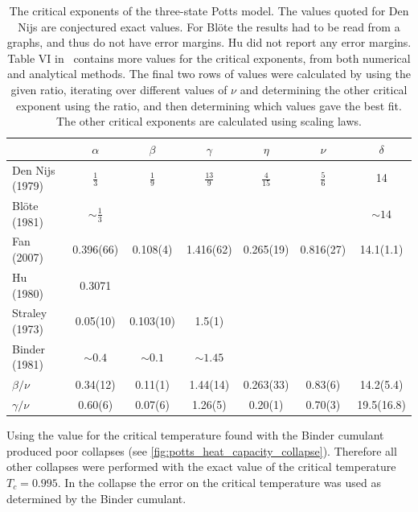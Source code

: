 \documentclass[11pt, a4paper]{report} %
\begin{document}
\begin{table}[htb]
	\begin{adjustbox}{center}
		\centering
		\renewcommand{\arraystretch}{1.5}
		\begin{tabular}{l | c c c c c c}
			\hline
			& \(\alpha\) & \(\beta\) & \(\gamma\) & \(\eta\) & \(\nu\) & \(\delta\) \\\hline
			Den Nijs (1979)~\cite{nijs:1979,baxter:1989} & \(\frac{1}{3}\) & \(\frac{1}{9}\) & \(\frac{13}{9}\) & \(\frac{4}{15}\) & \(\frac{5}{6}\) & 14 \\
			Blöte (1981)~\cite{blote:1981} & \(\sim\frac{1}{3}\) & & & & & \(\sim14\)\\
			Fan (2007)~\cite{fan:2007} & 0.396(66) & 0.108(4) & 1.416(62) & 0.265(19) & 0.816(27) & 14.1(1.1) \\
			Hu (1980)~\cite{hu:1980} & 0.3071 & \\
			Straley (1973)~\cite{straley:1973} & 0.05(10)& 0.103(10) & 1.5(1)\\
			Binder (1981)~\cite{binder:1981a} & \(\sim0.4\) & \(\sim0.1\) & \(\sim1.45\)\\
			\(\beta/\nu\) & 0.34(12) & 0.11(1) & 1.44(14) & 0.263(33) & 0.83(6) & 14.2(5.4)\\
			\(\gamma/\nu\) & 0.60(6) & 0.07(6) & 1.26(5) & 0.20(1) & 0.70(3) & 19.5(16.8)\\\hline
		\end{tabular}
	\end{adjustbox}
	\caption{The critical exponents of the three-state Potts model. The values quoted for Den Nijs are conjectured exact values. For Blöte the results had to be read from a graphs, and thus do not have error margins. Hu did not report any error margins.
	Table VI in~\cite{wu:1982} contains more values for the critical exponents, from both numerical and analytical methods.
	The final two rows of values were calculated by using the given ratio, iterating over different values of \(\nu\) and determining the other critical exponent using the ratio, and then determining which values gave the best fit. The other critical exponents are calculated using scaling laws.}
	\label{tab:potts_critical_exponents}
\end{table}

Using the  value for the critical temperature found with the Binder cumulant produced poor collapses (see \cref{fig:potts_heat_capacity_collapse}).
Therefore all other collapses were performed with the exact value of the critical temperature \(T_c=0.995\).
In the collapse the error on the critical temperature was used as determined by the Binder cumulant.
\end{document}
